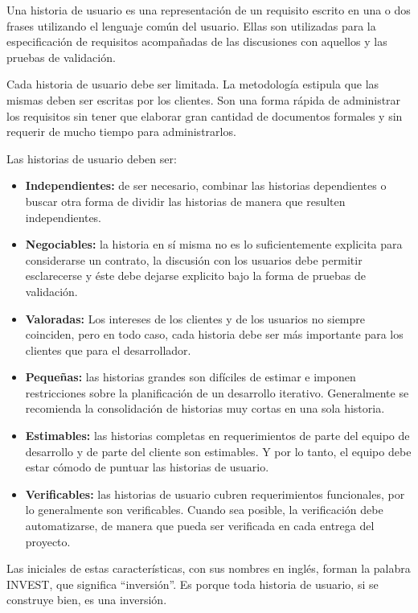 Una historia de usuario es una representación de un requisito escrito en una o dos frases utilizando el lenguaje común del usuario\citep{davis_agile_2015}. Ellas son utilizadas para la especificación de requisitos acompañadas de las discusiones con aquellos y las pruebas de validación.

Cada historia de usuario debe ser limitada. La metodología estipula que las mismas deben ser escritas por los clientes. Son una forma rápida de administrar los requisitos sin tener que elaborar gran cantidad de documentos formales y sin requerir de mucho tiempo para administrarlos.

Las historias de usuario deben ser:
\begin{itemize}
    \item \textbf{Independientes:} de ser necesario, combinar las historias dependientes o buscar otra forma de dividir las historias de manera que resulten independientes.
    \item \textbf{Negociables:} la historia en sí misma no es lo suficientemente explicita para considerarse un contrato, la discusión con los usuarios debe permitir esclarecerse y éste debe dejarse explicito bajo la forma de pruebas de validación.
    \item \textbf{Valoradas:} Los intereses de los clientes y de los usuarios no siempre coinciden, pero en todo caso, cada historia debe ser más importante para los clientes que para el desarrollador.
    \item \textbf{Pequeñas:} las historias grandes son difíciles de estimar e imponen restricciones sobre la planificación de un desarrollo iterativo. Generalmente se recomienda la consolidación de historias muy cortas en una sola historia.
    \item \textbf{Estimables:} las historias completas en requerimientos de parte del equipo de desarrollo y de parte del cliente son estimables. Y por lo tanto, el equipo debe estar cómodo de puntuar las historias de usuario.
    \item \textbf{Verificables:} las historias de usuario cubren requerimientos funcionales, por lo generalmente son verificables. Cuando sea posible, la verificación debe automatizarse, de manera que pueda ser verificada en cada entrega del proyecto.
\end{itemize}

Las iniciales de estas características, con sus nombres en inglés, forman la palabra INVEST, que significa “inversión”. Es porque toda historia de usuario, si se construye bien, es una inversión.

